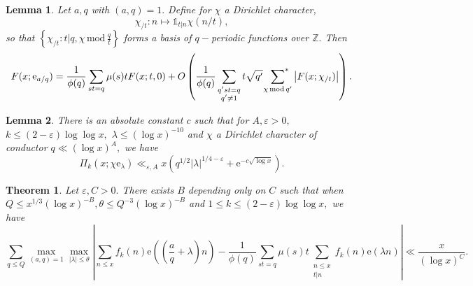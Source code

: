 \documentclass[10pt,a4paper]{amsart}
\newtheorem{theorem}{Theorem}
\newtheorem{lemma}{Lemma}
\newcommand{\Ind}{\mathbb{1}}
\newcommand{\Mod}{\,\mathrm{mod}\,}
\newcommand{\Z}{\mathds{Z}}
\newcommand{\e}{\mathrm{e}}
\newcommand{\eps}{\varepsilon}
\newcommand{\starsum}{\ \sideset{}{^*}\sum}
\begin{document}
\begin{lemma}\label{decomp}
    Let $a,q$ with $(a, q) = 1.$ Define for $\chi$ a Dirichlet character, $$\chi_{/t} : n \mapsto \Ind_{t|n}\chi(n/t),$$ so that $\left\{\chi_{/t} : t|q, \chi\Mod \frac{q}{t}\right\}$ forms a basis of $q-$periodic functions over $\Z.$ Then
    \begin{equation}\label{decomp-eq}
        F(x; \e_{a/q}) = \frac{1}{\phi(q)}\sum_{st = q} \mu(s) t F(x; t, 0) + O\left(\frac{1}{\phi(q)}\sum_{\substack{q'st = q \\ q'\ne 1}} t\sqrt{q'}\starsum_{\chi\Mod q'} \left|F(x; \chi_{/t})\right| \right).
    \end{equation}
\end{lemma}

\begin{lemma}\label{sw-pik}
    There is an absolute constant $c$ such that for $A, \eps > 0,$ $k \le (2-\eps)\log\log x, $ $\lambda \le (\log x)^{-10}$ and $\chi$ a Dirichlet character of conductor $q \ll (\log x)^A,$ we have $$\Pi_k(x; \chi\e_\lambda) \ll_{\eps, A} x\left(q^{1/2}|\lambda|^{1/4-\eps} + \e^{-c\sqrt{\log x}}\right).$$ 
\end{lemma}

\begin{theorem}\label{main}
    Let $\eps, C > 0.$ There exists $B$ depending only on $C$ such that when $Q \le x^{1/3}(\log x)^{-B}, \theta \le Q^{-3}(\log x)^{-B}$  and $1 \le k \le (2-\eps)\log\log x,$ we have
    \begin{equation}\label{main-eq}
        \sum_{q\le Q} \max_{(a,q) = 1} \max_{|\lambda|\le\theta} \left|\sum_{n\le x} f_k(n) \e\left(\left(\frac{a}{q}+\lambda\right)n\right) - \frac{1}{\phi(q)}\sum_{st = q} \mu(s) t\sum_{\substack{n\le x \\ t|n}} f_k(n)\e(\lambda n) \right| \ll \frac{x}{(\log x)^C}.
    \end{equation}
\end{theorem}
\end{document}
